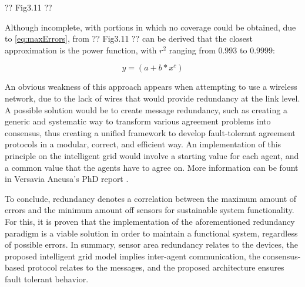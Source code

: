 \documentclass[12pt, english, a4paper]{report}
\begin{document}
?? Fig3.11 ??

Although incomplete, with portions in which no coverage could be obtained, due to \cref{eq:maxErrors}, from ?? Fig3.11 ?? can be derived 
that the closest approximation is the power function, with \(r^2\) ranging from \(0.993\) to \(0.9999\):

\begin{equation}
    \label{eq:variationControllers}
    y = (a + b * x^c)
\end{equation}

An obvious weakness of this approach appears when attempting to use a wireless network, due to the lack of wires that would provide
redundancy at the link level. A possible solution would be to create message redundancy, such as creating a generic and systematic 
way to transform various agreement problems into consensus, thus creating a unified framework to develop fault-tolerant agreement 
protocols in a modular, correct, and efficient way. An implementation of this principle on the intelligent grid would involve a starting
value for each agent, and a common value that the agents have to agree on. More information can be fount in Versavia Ancusa's PhD report 
\cite{106, 107}.

To conclude, redundancy denotes a correlation between the maximum amount of errors and the minimum amount off sensors for sustainable
system functionality. For this, it is proven that the implementation of the aforementioned redundancy paradigm is a viable solution in
order to maintain a functional system, regardless of possible errors. In summary, sensor area redundancy relates to the devices, the proposed
intelligent grid model implies inter-agent communication, the consensus-based protocol relates to the messages, and the proposed architecture
ensures fault tolerant behavior.


\printbibliography
{}
\end{document}
